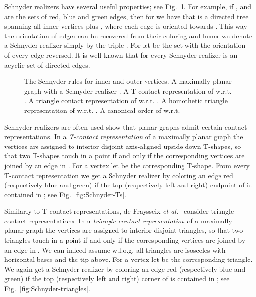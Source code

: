 \documentclass{llncs}
\begin{document}
Schnyder realizers have several useful properties; see Fig.~\ref{fig:Schnyder}. For example, if ,  and  are the sets of red, blue and green edges, then for  we have that  is a directed tree spanning all inner vertices plus , where each edge is oriented towards . This way the orientation of edges can be recovered from their coloring and hence we denote a Schnyder realizer simply by the triple .
For  let  be the set  with the orientation of every edge reversed. It is well-known that for every Schnyder realizer  is an acyclic set of directed edges.

\begin{figure}[t!]
\centering
 \caption{ The Schnyder rules for inner and outer vertices.  A maximally planar graph  with a Schnyder realizer .  A T-contact representation of  w.r.t. .  A triangle contact representation of  w.r.t. .  A homothetic triangle representation of  w.r.t. .  A canonical order of  w.r.t. .}
 \label{fig:Schnyder}
\end{figure}

Schnyder realizers are often used show that planar graphs admit certain contact representations. In a \emph{T-contact representation} of a maximally planar graph  the vertices are assigned to interior disjoint axis-aligned upside down T-shapes, so that two T-shapes touch in a point if and only if the corresponding vertices are joined by an edge in . For a vertex  let  be the corresponding T-shape. From every T-contact representation we get a Schnyder realizer by coloring an edge  red (respectively blue and green) if the top (respectively left and right) endpoint of  is contained in ; see Fig.~\ref{fig:Schnyder-Ts}.

Similarly to T-contact representations, de Fraysseix \textit{et al.}~\cite{FraysseixTContact} consider triangle contact representations. In a \emph{triangle contact representation} of a maximally planar graph  the vertices are assigned to interior disjoint triangles, so that two triangles touch in a point if and only if the corresponding vertices are joined by an edge in . We can indeed assume w.l.o.g. all triangles are isosceles with horizontal bases and the tip above. For a vertex  let  be the corresponding triangle. We again get a Schnyder realizer by coloring an edge  red (respectively blue and green) if the top (respectively left and right) corner of  is contained in ; see Fig.~\ref{fig:Schnyder-triangles}.
\end{document}
